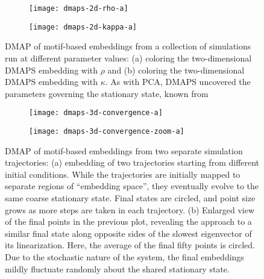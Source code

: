   \begin{figure}
    \vspace{-5mm} \centering
    \begin{subfigure}{0.49\textwidth}
      \centering
      \texttt{[image: dmaps-2d-rho-a]}
      \subcaption{\label{fig:dmaps-rho}}
    \end{subfigure} %
    \begin{subfigure}{0.49\textwidth}
      \centering
      \texttt{[image: dmaps-2d-kappa-a]}
      \subcaption{\label{fig:dmaps-kappa}}
    \end{subfigure}%
    \caption[DMAP of motif-based embeddings when system parameters are
    varied]{DMAP of motif-based embeddings from a collection of
      simulations run at different parameter values: (a) coloring the
      two-dimensional DMAPS embedding with $\rho$ and (b) coloring the
      two-dimensional DMAPS embedding with $\kappa$. As with PCA,
      DMAPS uncovered the parameters governing the stationary state,
      known from \cite{rath_time_2012} \label{fig:dmaps-rk}}
  \end{figure}

  \begin{figure}
    \vspace{-5mm} \centering
    \begin{subfigure}{0.49\textwidth}
      \centering
      \texttt{[image: dmaps-3d-convergence-a]}
      \subcaption{\label{fig:dmaps-results-regular}}
    \end{subfigure} %
    \begin{subfigure}{0.49\textwidth}
      \centering
      \texttt{[image: dmaps-3d-convergence-zoom-a]}
      \subcaption{\label{fig:dmaps-results-zoom}}
    \end{subfigure}%
    \caption[DMAP of motif-based embeddings when two trajectories are
    sampled]{DMAP of motif-based embeddings from two separate
      simulation trajectories: (a) embedding of two trajectories
      starting from different initial conditions. While the
      trajectories are initially mapped to separate regions of
      ``embedding space'', they eventually evolve to the same coarse
      stationary state.  Final states are circled, and point size
      grows as more steps are taken in each trajectory.  (b) Enlarged
      view of the final points in the previous plot, revealing the
      approach to a similar final state along opposite sides of the
      slowest eigenvector of its linearization.  Here, the average of
      the final fifty points is circled. Due to the stochastic nature
      of the system, the final embeddings mildly fluctuate randomly
      about the shared stationary state. \label{fig:dmaps-results}}
  \end{figure}

